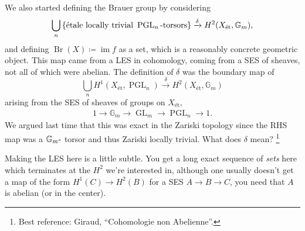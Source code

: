 We also started defining the Brauer group by considering
\begin{align*}  
\bigcup_n \left\{{\text{étale locally trivial } \operatorname{PGL}_n{\hbox{-}}\text{torsors}}\right\}
\xrightarrow{\delta}
H^2(X_\text{ét}, {\mathbb{G}}_m)
,\end{align*}
and defining \(\operatorname{Br}(X) \coloneqq\operatorname{im}f\) as a
set, which is a reasonably concrete geometric object. This map came from
a LES in cohomology, coming from a SES of sheaves, not all of which were
abelian. The definition of \(\delta\) was the boundary map of
\begin{equation}\label{eq:12_union_1}
\bigcup_n H^1(X_\text{ét}, \operatorname{PGL}_n)
\xrightarrow{\delta}
H^2(X_\text{ét}, {\mathbb{G}}_m)
\end{equation}
arising from the SES of sheaves of groups on \(X_\text{ét}\),
\begin{align*}  
1 
\to {\mathbb{G}}_m 
\xrightarrow{} 
\operatorname{GL}_m
\xrightarrow{}
\operatorname{PGL}_n \to 1
.\end{align*}
We argued last time that this was exact in the Zariski topology since
the RHS map was a \({\mathbb{G}}_m{\hbox{-}}\) torsor and thus Zariski
locally trivial. What does \(\delta\) mean? \footnote{Best reference:
  Giraud, ``Cohomologie non Abelienne''.}

\begin{remark}

Making the LES here is a little subtle. You get a long exact sequence of
\emph{sets} here which terminates at the \(H^2\) we're interested in,
although one usually doesn't get a map of the form \(H^1(C) \to H^2(B)\)
for a SES \(A \xrightarrow{}B \xrightarrow{}C\), you need that \(A\) is
abelian (or in the center).

\end{remark}

